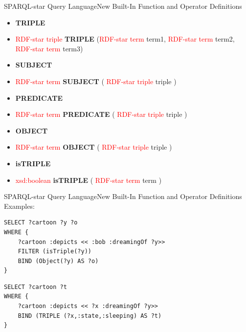 \documentclass[aspectratio=169]{beamer}
\begin{document}
\begin{frame}{SPARQL-star Query Language}{New Built-In Function and Operator Definitions}
\begin{itemize}
    \item \textbf{TRIPLE}
    \item[] \textcolor{red}{RDF-star triple} \textbf{TRIPLE} (\textcolor{red}{RDF-star term} term1, \textcolor{red}{RDF-star term} term2, \textcolor{red}{RDF-star term} term3)
    \item \textbf{SUBJECT}
    \item[] \textcolor{red}{RDF-star term} \textbf{SUBJECT} ( \textcolor{red}{RDF-star triple} triple )
    \item \textbf{PREDICATE}
    \item[] \textcolor{red}{RDF-star term} \textbf{PREDICATE} ( \textcolor{red}{RDF-star triple} triple )
    \item \textbf{OBJECT}
    \item[] \textcolor{red}{RDF-star term} \textbf{OBJECT} ( \textcolor{red}{RDF-star triple} triple )
    \item \textbf{isTRIPLE}
    \item[] \textcolor{red}{xsd:boolean} \textbf{isTRIPLE} ( \textcolor{red}{RDF-star term} term )
\end{itemize}
\end{frame}

\begin{frame}[fragile]{SPARQL-star Query Language}{New Built-In Function and Operator Definitions}
Examples:
\begin{lstlisting}[language=SPARQL]
SELECT ?cartoon ?y ?o
WHERE {
    ?cartoon :depicts << :bob :dreamingOf ?y>>
    FILTER (isTriple(?y))
    BIND (Object(?y) AS ?o)
}
\end{lstlisting}

\begin{lstlisting}[language=SPARQL]
SELECT ?cartoon ?t
WHERE {
    ?cartoon :depicts << ?x :dreamingOf ?y>>
    BIND (TRIPLE (?x,:state,:sleeping) AS ?t)
}
\end{lstlisting}
\end{frame}
\end{document}

